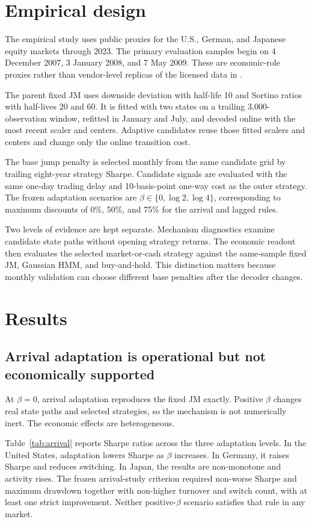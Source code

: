 \documentclass[11pt]{article}
\begin{document}
\section{Empirical design}

The empirical study uses public proxies for the U.S., German, and Japanese equity markets through 2023. The primary evaluation samples begin on 4 December 2007, 3 January 2008, and 7 May 2009. These are economic-role proxies rather than vendor-level replicas of the licensed data in \citet{shu2024}.

The parent fixed JM uses downside deviation with half-life 10 and Sortino ratios with half-lives 20 and 60. It is fitted with two states on a trailing 3,000-observation window, refitted in January and July, and decoded online with the most recent scaler and centers. Adaptive candidates reuse those fitted scalers and centers and change only the online transition cost.

The base jump penalty is selected monthly from the same candidate grid by trailing eight-year strategy Sharpe. Candidate signals are evaluated with the same one-day trading delay and 10-basis-point one-way cost as the outer strategy. The frozen adaptation scenarios are $\beta\in\{0,\log 2,\log 4\}$, corresponding to maximum discounts of 0\%, 50\%, and 75\% for the arrival and lagged rules.

Two levels of evidence are kept separate. Mechanism diagnostics examine candidate state paths without opening strategy returns. The economic readout then evaluates the selected market-or-cash strategy against the same-sample fixed JM, Gaussian HMM, and buy-and-hold. This distinction matters because monthly validation can choose different base penalties after the decoder changes.

\section{Results}

\subsection{Arrival adaptation is operational but not economically supported}

At $\beta=0$, arrival adaptation reproduces the fixed JM exactly. Positive $\beta$ changes real state paths and selected strategies, so the mechanism is not numerically inert. The economic effects are heterogeneous.

Table~\ref{tab:arrival} reports Sharpe ratios across the three adaptation levels. In the United States, adaptation lowers Sharpe as $\beta$ increases. In Germany, it raises Sharpe and reduces switching. In Japan, the results are non-monotone and activity rises. The frozen arrival-study criterion required non-worse Sharpe and maximum drawdown together with non-higher turnover and switch count, with at least one strict improvement. Neither positive-$\beta$ scenario satisfies that rule in any market.
\end{document}

